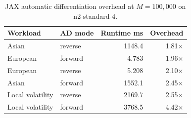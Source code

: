 \begin{table}[htbp]
\centering
\small
\caption{JAX automatic differentiation overhead at $M=100{,}000$ on n2-standard-4.}
\label{tab:ad-overhead}
\begin{tabular}{llrr}
\toprule
\textbf{Workload} & \textbf{AD mode} & \textbf{Runtime ms} & \textbf{Overhead} \\
\midrule
Asian & reverse & 1148.4 & 1.81$\times$ \\
European & forward & 4.783 & 1.96$\times$ \\
European & reverse & 5.208 & 2.10$\times$ \\
Asian & forward & 1552.1 & 2.45$\times$ \\
Local volatility & reverse & 2169.7 & 2.55$\times$ \\
Local volatility & forward & 3768.5 & 4.42$\times$ \\
\bottomrule
\end{tabular}
\end{table}
